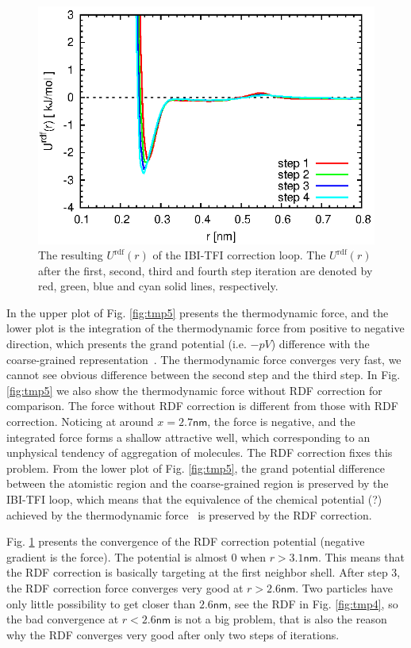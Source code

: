\documentclass[aps,pre,preprint,unsortedaddress]{revtex4}
\begin{document}
\begin{figure}
  \centering
  \includegraphics{fig.2/force-rdf.eps}
  \caption{The resulting $U^{\textrm{rdf}}(r)$ of the IBI-TFI
    correction loop.  The $U^{\textrm{rdf}}(r)$ after the first,
    second, third and fourth step iteration are denoted by red, green,
    blue and cyan solid lines, respectively.  }
  \label{fig:tmp6}
\end{figure}

In the upper plot of Fig. \ref{fig:tmp5} presents the thermodynamic
force, and the lower plot is the integration of
the thermodynamic force from positive to negative direction, which
presents the grand potential (i.e. $-pV$) difference with the
coarse-grained representation~\cite{fritsch2011grand}.
The thermodynamic force converges very
fast, we cannot see obvious difference between the second
step and the third step.  In Fig. \ref{fig:tmp5} we also show the
thermodynamic force without RDF correction for comparison. The force
without RDF correction is different from those with RDF
correction. Noticing at around $x=2.7 \textsf{nm}$, the force is
negative, and the integrated force forms a shallow attractive well,
which corresponding to an unphysical tendency of aggregation of molecules. The RDF
correction fixes this problem. From the lower plot of
Fig. \ref{fig:tmp5}, the grand potential difference between the
atomistic region and the coarse-grained region is preserved by the
IBI-TFI loop, which means that the equivalence of the chemical
potential (?) achieved by the thermodynamic
force~\cite{fritsch2011grand} is preserved by the RDF correction.

Fig. \ref{fig:tmp6} presents the convergence of the RDF correction
potential (negative gradient is the force). The potential is almost 0
when $r > 3.1\textsf{nm}$. This means that the RDF correction is
basically targeting at the first neighbor shell. After step 3, the RDF
correction force converges very good at $r > 2.6\textsf{nm}$. Two
particles have only little possibility to get closer than $2.6\textsf{nm}$,
see the RDF in Fig. \ref{fig:tmp4}, so the bad convergence at $r <
2.6\textsf{nm}$ is not a big problem, that is also the reason why the
RDF converges very good after only two steps of iterations.
\end{document}
